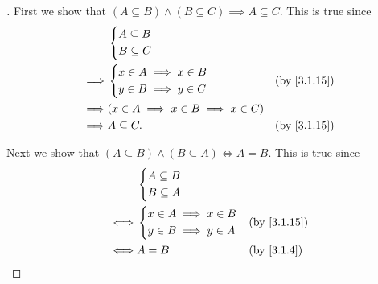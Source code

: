 \begin{proof}[]
  First we show that \((A \subseteq B) \land (B \subseteq C) \implies A \subseteq C\).
  This is true since
  \begin{align*}
             & \begin{dcases}
                 A \subseteq B \\
                 B \subseteq C
               \end{dcases}                                                \\
    \implies & \begin{dcases}
                 x \in A \implies x \in B \\
                 y \in B \implies y \in C
               \end{dcases}                 &  & \by{3.1.15}                \\
    \implies & (x \in A \implies x \in B \implies x \in C)                  \\
    \implies & A \subseteq C.                              &  & \by{3.1.15}
  \end{align*}

  Next we show that \((A \subseteq B) \land (B \subseteq A) \iff A = B\).
  This is true since
  \begin{align*}
         & \begin{dcases}
             A \subseteq B \\
             B \subseteq A
           \end{dcases}                               \\
    \iff & \begin{dcases}
             x \in A \implies x \in B \\
             y \in B \implies y \in A
           \end{dcases} &  & \by{3.1.15}               \\
    \iff & A = B.                      &  & \by{3.1.4}
  \end{align*}


\end{proof}
